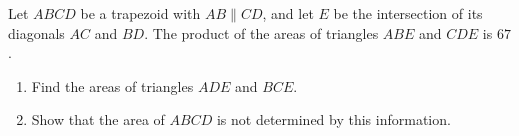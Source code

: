 Let $ABCD$ be a trapezoid with $AB\parallel CD$, and let $E$ be the intersection of its diagonals $AC$ and $BD$. The product of the areas of triangles $ABE$ and $CDE$ is $67$.
\begin{enumerate}
\item[(a)] Find the areas of triangles $ADE$ and $BCE$.
\item[(b)] Show that the area of $ABCD$ is not determined by this information.
\end{enumerate}
